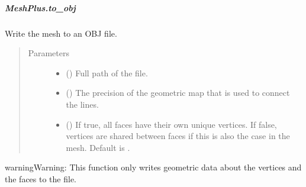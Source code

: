 \documentclass[letterpaper,10pt,english]{sphinxmanual}
\begin{document}
\begin{fulllineitems}
\subparagraph{MeshPlus.to\_obj}
\label{\detokenize{api/generated/directional_clustering.mesh.MeshPlus.to_obj:meshplus-to-obj}}\label{\detokenize{api/generated/directional_clustering.mesh.MeshPlus.to_obj::doc}}

\begin{fulllineitems}
\label{\detokenize{api/generated/directional_clustering.mesh.MeshPlus.to_obj:directional_clustering.mesh.MeshPlus.to_obj}}
Write the mesh to an OBJ file.
\begin{quote}\begin{description}
\item[{Parameters}] \leavevmode\begin{itemize}
\item {} 
 () \textendash{} Full path of the file.

\item {} 
 () \textendash{} The precision of the geometric map that is used to connect the lines.

\item {} 
 () \textendash{} If true, all faces have their own unique vertices.
If false, vertices are shared between faces if this is also the case in the mesh.
Default is .

\end{itemize}

\end{description}\end{quote}

\begin{sphinxadmonition}{warning}{Warning:}
This function only writes geometric data about the vertices and
the faces to the file.
\end{sphinxadmonition}

\end{fulllineitems}




\end{fulllineitems}
\end{document}
